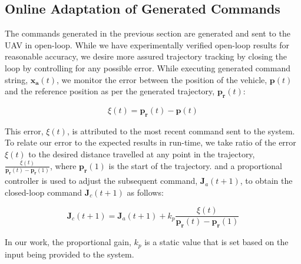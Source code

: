\documentclass[letterpaper, 10 pt, conference]{ieeeconf}  %
\begin{document}
\subsection{Online Adaptation of Generated Commands} \label{sec:adapt}

The commands generated in the previous section are generated and sent to the UAV in open-loop. While we have experimentally verified open-loop results for reasonable accuracy, we desire more assured trajectory tracking by closing the loop by controlling for any possible error. While executing generated command string, $\bm{x_a}(t)$, we monitor the error between the position of the vehicle, $\bm{p}(t)$ and the reference position as per the generated trajectory, $\bm{p_r}(t)$:

\begin{equation}
    \xi(t) = \bm{p_r}(t)-\bm{p}(t)
\end{equation}

This error, $\xi(t)$, is attributed to the most recent command sent to the system. To relate our error to the expected results in run-time, we take ratio of the error $\xi(t)$ to the desired distance travelled at any point in the trajectory, $\frac{\xi(t)}{\bm{p_r}(t)-\bm{p_r}(1)}$, where $\bm{p_r}(1)$ is the start of the trajectory. and a proportional controller is used to adjust the subsequent command, $\bm{J}_a(t+1)$, to obtain the closed-loop command $\bm{J}_c(t+1)$ as follows:

\begin{equation}
    \bm{J}_c(t+1) = \bm{J}_a(t+1) + k_p\frac{\xi(t)}{\bm{p_r}(t)-\bm{p_r}(1)}
\end{equation}

In our work, the proportional gain, $k_p$ is a static value that is set based on the input being provided to the system. 

\end{document}
